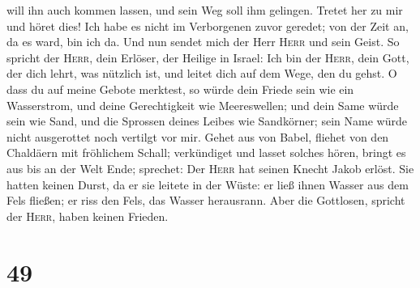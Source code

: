 will ihn auch kommen lassen, und sein Weg soll ihm gelingen.
 Tretet her zu mir und höret dies! Ich habe es nicht im
Verborgenen zuvor geredet; von der Zeit an, da es ward, bin ich da. Und
nun sendet mich der Herr \textsc{Herr} und sein Geist. 
So spricht der \textsc{Herr}, dein Erlöser, der Heilige in Israel: Ich
bin der \textsc{Herr}, dein Gott, der dich lehrt, was nützlich ist, und
leitet dich auf dem Wege, den du gehst.  O dass du auf
meine Gebote merktest, so würde dein Friede sein wie ein Wasserstrom,
und deine Gerechtigkeit wie Meereswellen;  und dein Same
würde sein wie Sand, und die Sprossen deines Leibes wie Sandkörner; sein
Name würde nicht ausgerottet noch vertilgt vor mir. 
Gehet aus von Babel, fliehet von den Chaldäern mit fröhlichem Schall;
verkündiget und lasset solches hören, bringt es aus bis an der Welt
Ende; sprechet: Der \textsc{Herr} hat seinen Knecht Jakob erlöst.
 Sie hatten keinen Durst, da er sie leitete in der Wüste:
er ließ ihnen Wasser aus dem Fels fließen; er riss den Fels, das Wasser
herausrann.  Aber die Gottlosen, spricht der
\textsc{Herr}, haben keinen Frieden.

\hypertarget{section-48}{%
\section{49}\label{section-48}}

